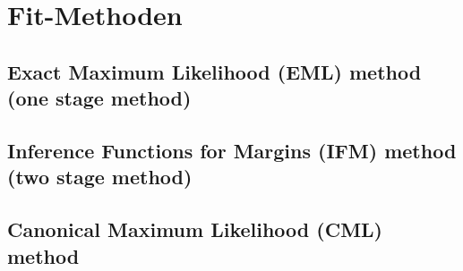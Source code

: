 
\section{Fit-Methoden}
\label{sec:fitmethoden}

\subsection{Exact Maximum Likelihood (EML) method (one stage method)}
\label{sec:eml}

\subsection{Inference Functions for Margins (IFM) method (two stage method)}
\label{sec:ifm}

\subsection{Canonical Maximum Likelihood (CML) method}
\label{sec:cml}

